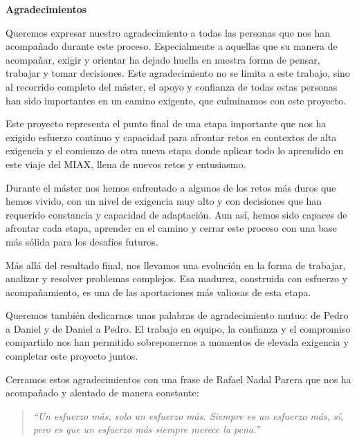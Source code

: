 \thispagestyle{empty}

\begin{center}
  {\large\bfseries Agradecimientos}\\
\end{center}

Queremos expresar nuestro agradecimiento a todas las personas que nos han acompañado durante este proceso. Especialmente a aquellas que su manera de acompañar, exigir y orientar ha dejado huella en nuestra forma de pensar, trabajar y tomar decisiones. Este agradecimiento no se limita a este trabajo, sino al recorrido completo del máster, el apoyo y confianza de todas estas personas han sido importantes en un camino exigente, que culminamos con este proyecto. 

Este proyecto representa el punto final de una etapa importante que nos ha exigido esfuerzo continuo y capacidad para afrontar retos en contextos de alta exigencia y el comienzo de otra nueva etapa donde aplicar todo lo aprendido en este viaje del MIAX, llena de nuevos retos y entusiasmo.

Durante el máster nos hemos enfrentado a algunos de los retos más duros que hemos vivido, con un nivel de exigencia muy alto y con decisiones que han requerido constancia y capacidad de adaptación. Aun así, hemos sido capaces de afrontar cada etapa, aprender en el camino y cerrar este proceso con una base más sólida para los desafíos futuros.

Más allá del resultado final, nos llevamos una evolución en la forma de trabajar, analizar y resolver problemas complejos. Esa madurez, construida con esfuerzo y acompañamiento, es una de las aportaciones más valiosas de esta etapa.



Queremos también dedicarnos unas palabras de agradecimiento mutuo: de Pedro a Daniel y de Daniel a Pedro. El trabajo en equipo, la confianza y el compromiso compartido nos han permitido sobreponernos a momentos de elevada exigencia y completar este proyecto juntos.

Cerramos estos agradecimientos con una frase de Rafael Nadal Parera que nos ha acompañado y alentado de manera constante:

\begin{quote}
\centering
\textit{``Un esfuerzo más, solo un esfuerzo más. Siempre es un esfuerzo más, sí, pero es que un esfuerzo más siempre merece la pena.''}
\end{quote}

\newpage